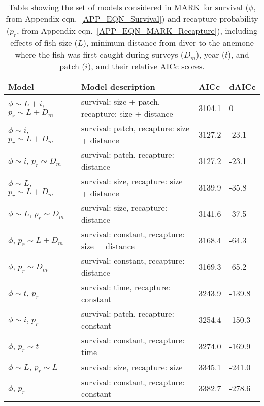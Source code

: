 \documentclass[12pt, oneside]{article}   	%
\begin{document}
\begin{table}[!htbp]
\begin{centering}
\caption{Table showing the set of models considered in MARK for survival ($\phi$, from Appendix eqn.\ \ref{APP_EQN_Survival}) and recapture probability ($p_r$, from Appendix eqn.\ \ref{APP_EQN_MARK_Recapture}), including effects of fish size ($L$), minimum distance from diver to the anemone where the fish was first caught during surveys ($D_m$), year ($t$), and patch ($i$), and their relative AICc scores.}\label{APP_TAB_MARKmodels}
\begin{tabular}{|p{1.75in}|p{2.75in}|p{0.75in}|p{0.75in}|}
\hline 
\textbf{Model} & \textbf{Model description} & \textbf{AICc} & \textbf{dAICc} \\ \hline
$\phi \sim L+i$, $p_r \sim L+D_m$ & survival: size + patch, recapture: size + distance & 3104.1 & 0 \\ \hline
$\phi \sim i$, $p_r \sim L+D_m$ & survival: patch, recapture: size + distance & 3127.2 & -23.1 \\ \hline
$\phi \sim i$, $p_r \sim D_m$ & survival: patch, recapture: distance & 3127.2 & -23.1 \\ \hline
$\phi \sim L$, $p_r \sim L+D_m$ & survival: size, recapture: size + distance & 3139.9 & -35.8 \\ \hline
$\phi \sim L$, $p_r \sim D_m$ & survival: size, recapture: distance & 3141.6 & -37.5 \\ \hline
$\phi$, $p_r \sim L+D_m$ & survival: constant, recapture: size + distance & 3168.4 & -64.3 \\ \hline
$\phi$, $p_r \sim D_m$ & survival: constant, recapture: distance & 3169.3 & -65.2 \\ \hline
$\phi \sim t$, $p_r$ & survival: time, recapture: constant & 3243.9 & -139.8 \\ \hline
$\phi \sim i$, $p_r$ & survival: patch, recapture: constant & 3254.4 & -150.3 \\ \hline
$\phi$, $p_r \sim t$ & survival: constant, recapture: time & 3274.0 & -169.9 \\ \hline
$\phi \sim L$, $p_r \sim L$ & survival: size, recapture: size & 3345.1 & -241.0 \\ \hline
$\phi$, $p_r$ & survival: constant, recapture: constant & 3382.7 & -278.6 \\ \hline
\end{tabular}
\end{centering}
\end{table}
\end{document}
